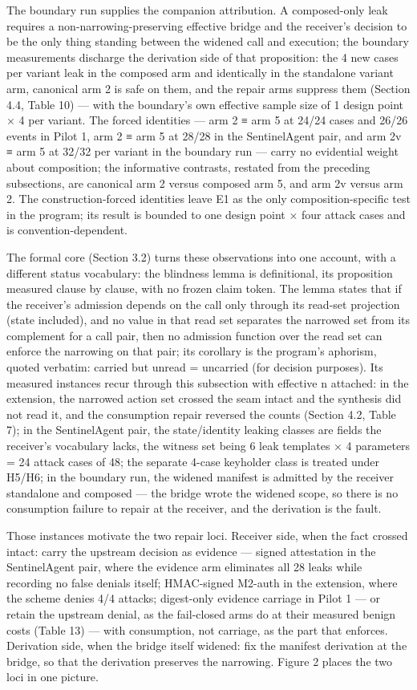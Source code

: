 \documentclass[
  10pt,
]{article}
\renewcommand{\_}{\origunderscore\allowbreak}
\begin{document}
The boundary run supplies the companion attribution. A composed-only
leak requires a non-narrowing-preserving effective bridge and the
receiver's decision to be the only thing standing between the widened
call and execution; the boundary measurements discharge the derivation
side of that proposition: the 4 new cases per variant leak in the
composed arm and identically in the standalone variant arm, canonical
arm 2 is safe on them, and the repair arms suppress them (Section 4.4,
Table 10) --- with the boundary's own effective sample size of 1 design
point × 4 per variant. The forced identities --- arm 2 ≡ arm 5 at 24/24
cases and 26/26 events in Pilot 1, arm 2 ≡ arm 5 at 28/28 in the
SentinelAgent pair, and arm 2v ≡ arm 5 at 32/32 per variant in the
boundary run --- carry no evidential weight about composition; the
informative contrasts, restated from the preceding subsections, are
canonical arm 2 versus composed arm 5, and arm 2v versus arm 2. The
construction-forced identities leave E1 as the only composition-specific
test in the program; its result is bounded to one design point × four
attack cases and is convention-dependent.

The formal core (Section 3.2) turns these observations into one account,
with a different status vocabulary: the blindness lemma is definitional,
its proposition measured clause by clause, with no frozen claim token.
The lemma states that if the receiver's admission depends on the call
only through its read-set projection (state included), and no value in
that read set separates the narrowed set from its complement for a call
pair, then no admission function over the read set can enforce the
narrowing on that pair; its corollary is the program's aphorism, quoted
verbatim: carried but unread = uncarried (for decision purposes). Its
measured instances recur through this subsection with effective n
attached: in the extension, the narrowed action set crossed the seam
intact and the synthesis did not read it, and the consumption repair
reversed the counts (Section 4.2, Table 7); in the SentinelAgent pair,
the state/identity leaking classes are fields the receiver's vocabulary
lacks, the witness set being 6 leak templates × 4 parameters = 24 attack
cases of 48; the separate 4-case keyholder class is treated under H5/H6;
in the boundary run, the widened manifest is admitted by the receiver
standalone and composed --- the bridge wrote the widened scope, so there
is no consumption failure to repair at the receiver, and the derivation
is the fault.

Those instances motivate the two repair loci. Receiver side, when the
fact crossed intact: carry the upstream decision as evidence --- signed
attestation in the SentinelAgent pair, where the evidence arm eliminates
all 28 leaks while recording no false denials itself; HMAC-signed
M2-auth in the extension, where the scheme denies 4/4 attacks;
digest-only evidence carriage in Pilot 1 --- or retain the upstream
denial, as the fail-closed arms do at their measured benign costs (Table
13) --- with consumption, not carriage, as the part that enforces.
Derivation side, when the bridge itself widened: fix the manifest
derivation at the bridge, so that the derivation preserves the
narrowing. Figure 2 places the two loci in one picture.
\end{document}
